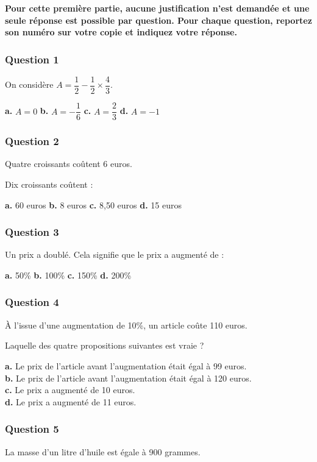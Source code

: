 \textbf{Pour cette première partie, aucune justification n'est demandée et une seule réponse est possible par question. Pour chaque question, reportez son numéro sur votre copie et indiquez votre réponse.}

\subsubsection*{Question 1}
On considère $A = \dfrac{1}{2} - \dfrac{1}{2} \times \dfrac{4}{3}$.

\textbf{a.} $A = 0$ \hfill \textbf{b.} $A = -\dfrac{1}{6}$ \hfill \textbf{c.} $A = \dfrac{2}{3}$ \hfill \textbf{d.} $A = -1$

\subsubsection*{Question 2}
Quatre croissants coûtent 6 euros.

Dix croissants coûtent :

\textbf{a.} 60 euros \hfill \textbf{b.} 8 euros \hfill \textbf{c.} 8,50 euros \hfill \textbf{d.} 15 euros

\subsubsection*{Question 3}
Un prix a doublé. Cela signifie que le prix a augmenté de :

\textbf{a.} 50\% \hfill \textbf{b.} 100\% \hfill \textbf{c.} 150\% \hfill \textbf{d.} 200\%

\subsubsection*{Question 4}
À l'issue d'une augmentation de 10\%, un article coûte 110 euros.

Laquelle des quatre propositions suivantes est vraie ?

\textbf{a.} Le prix de l'article avant l'augmentation était égal à 99 euros. \\
\textbf{b.} Le prix de l'article avant l'augmentation était égal à 120 euros. \\
\textbf{c.} Le prix a augmenté de 10 euros. \\
\textbf{d.} Le prix a augmenté de 11 euros.

\subsubsection*{Question 5}
La masse d'un litre d'huile est égale à 900 grammes.

